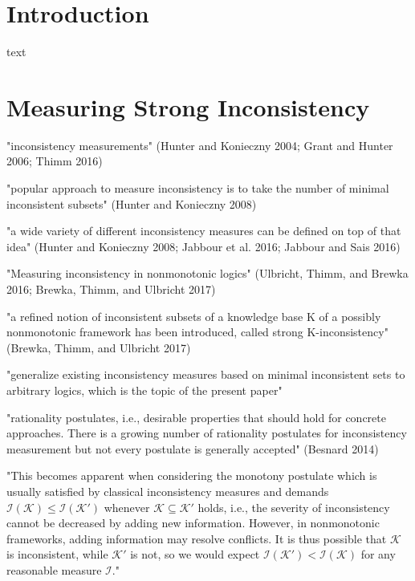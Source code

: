 \section{Introduction}
text

\section{Measuring Strong Inconsistency}
\cite{ulbricht_measuring_2018}

"inconsistency measurements"
(Hunter and Konieczny 2004; Grant and Hunter 2006; Thimm 2016)
\cite{bertossi_approaches_2005} \cite{grant_measuring_2006}

"popular approach to measure inconsistency is to take the number of minimal inconsistent subsets"
(Hunter and Konieczny 2008)
\cite{hunter_measuring_2008}

"a wide variety of different inconsistency measures can be defined on top of that idea"
(Hunter and Konieczny 2008; Jabbour et al. 2016; Jabbour and Sais 2016)
\cite{hunter_measuring_2008} \cite{jabbour_mis_2016}

"Measuring inconsistency in nonmonotonic logics"
(Ulbricht, Thimm, and Brewka 2016; Brewka, Thimm, and Ulbricht 2017)
\cite{michael_measuring_2016} \cite{brewka_strong_2017}

"a refined notion of inconsistent subsets of a knowledge base K of a possibly nonmonotonic framework has been introduced, called strong K-inconsistency"
(Brewka, Thimm, and Ulbricht 2017)
\cite{brewka_strong_2017}

"generalize existing inconsistency measures based on minimal inconsistent sets to arbitrary logics, which is the topic of the present paper"

"rationality postulates, i.e., desirable properties that should hold for concrete approaches. There is a growing number of rationality postulates for inconsistency measurement but not every postulate is generally accepted"
(Besnard 2014)
\cite{ferme_revisiting_2014}

"This becomes apparent when considering the monotony postulate which is usually satisfied by classical inconsistency measures and demands \(\mathcal{I}(\mathcal{K}) \leq \mathcal{I}(\mathcal{K}')\) whenever \(\mathcal{K} \subseteq \mathcal{K}'\) holds, i.e., the severity of inconsistency cannot be decreased by adding new information. However, in nonmonotonic frameworks, adding information may resolve conflicts. It is thus possible that \(\mathcal{K}\) is inconsistent, while \(\mathcal{K}'\) is not, so we would expect \(\mathcal{I}(\mathcal{K}') < \mathcal{I}(\mathcal{K})\) for any reasonable measure \(\mathcal{I}\)."

